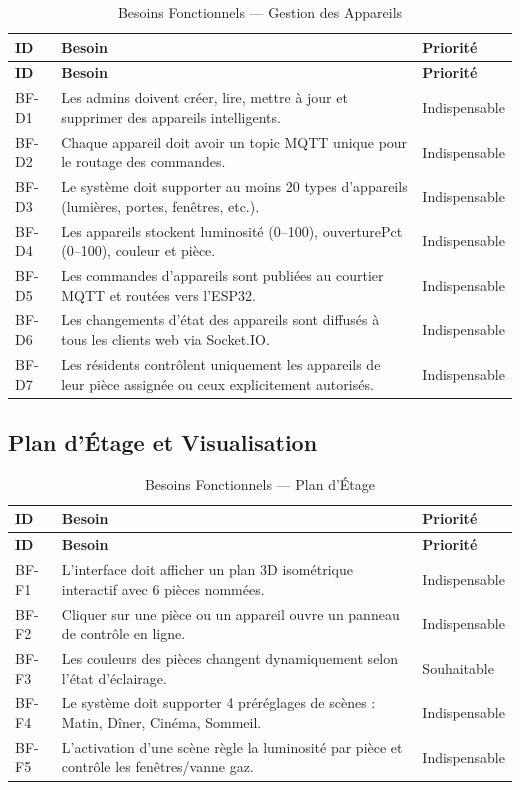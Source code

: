 \begin{longtable}{p{} p{} p{}}
\caption{Besoins Fonctionnels --- Gestion des Appareils}\label{tab:bf_device}\\
\toprule
\textbf{ID} & \textbf{Besoin} & \textbf{Priorité} \\
\midrule
\endfirsthead
\toprule
\textbf{ID} & \textbf{Besoin} & \textbf{Priorité} \\
\midrule
\endhead
\bottomrule
\endfoot
BF-D1 & Les admins doivent créer, lire, mettre à jour et supprimer des appareils intelligents. & Indispensable \\
BF-D2 & Chaque appareil doit avoir un topic MQTT unique pour le routage des commandes. & Indispensable \\
BF-D3 & Le système doit supporter au moins 20 types d'appareils (lumières, portes, fenêtres, etc.). & Indispensable \\
BF-D4 & Les appareils stockent luminosité (0--100), ouverturePct (0--100), couleur et pièce. & Indispensable \\
BF-D5 & Les commandes d'appareils sont publiées au courtier MQTT et routées vers l'ESP32. & Indispensable \\
BF-D6 & Les changements d'état des appareils sont diffusés à tous les clients web via Socket.IO. & Indispensable \\
BF-D7 & Les résidents contrôlent uniquement les appareils de leur pièce assignée ou ceux explicitement autorisés. & Indispensable \\
\end{longtable}

\subsection{Plan d'Étage et Visualisation}

\begin{longtable}{p{} p{} p{}}
\caption{Besoins Fonctionnels --- Plan d'Étage}\label{tab:bf_fp}\\
\toprule
\textbf{ID} & \textbf{Besoin} & \textbf{Priorité} \\
\midrule
\endfirsthead
\toprule
\textbf{ID} & \textbf{Besoin} & \textbf{Priorité} \\
\midrule
\endhead
\bottomrule
\endfoot
BF-F1 & L'interface doit afficher un plan 3D isométrique interactif avec 6 pièces nommées. & Indispensable \\
BF-F2 & Cliquer sur une pièce ou un appareil ouvre un panneau de contrôle en ligne. & Indispensable \\
BF-F3 & Les couleurs des pièces changent dynamiquement selon l'état d'éclairage. & Souhaitable \\
BF-F4 & Le système doit supporter 4 préréglages de scènes : Matin, Dîner, Cinéma, Sommeil. & Indispensable \\
BF-F5 & L'activation d'une scène règle la luminosité par pièce et contrôle les fenêtres/vanne gaz. & Indispensable \\
\end{longtable}

